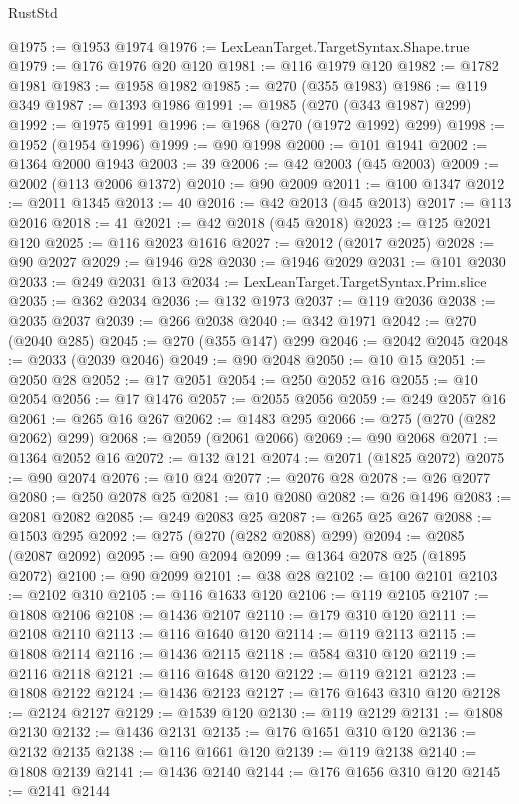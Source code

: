 \begin{lexlean}{RustStd}
\begin{coremodule}
@1975 := @1953 @1974
@1976 := LexLeanTarget.TargetSyntax.Shape.true
@1979 := @176 @1976 @20 @120
@1981 := @116 @1979 @120
@1982 := @1782 @1981
@1983 := @1958 @1982
@1985 := @270 (@355 @1983)
@1986 := @119 @349
@1987 := @1393 @1986
@1991 := @1985 (@270 (@343 @1987) @299)
@1992 := @1975 @1991
@1996 := @1968 (@270 (@1972 @1992) @299)
@1998 := @1952 (@1954 @1996)
@1999 := @90 @1998
@2000 := @101 @1941
@2002 := @1364 @2000 @1943
@2003 := 39
@2006 := @42 @2003 (@45 @2003)
@2009 := @2002 (@113 @2006 @1372)
@2010 := @90 @2009
@2011 := @100 @1347
@2012 := @2011 @1345
@2013 := 40
@2016 := @42 @2013 (@45 @2013)
@2017 := @113 @2016
@2018 := 41
@2021 := @42 @2018 (@45 @2018)
@2023 := @125 @2021 @120
@2025 := @116 @2023 @1616
@2027 := @2012 (@2017 @2025)
@2028 := @90 @2027
@2029 := @1946 @28
@2030 := @1946 @2029
@2031 := @101 @2030
@2033 := @249 @2031 @13
@2034 := LexLeanTarget.TargetSyntax.Prim.slice
@2035 := @362 @2034
@2036 := @132 @1973
@2037 := @119 @2036
@2038 := @2035 @2037
@2039 := @266 @2038
@2040 := @342 @1971
@2042 := @270 (@2040 @285)
@2045 := @270 (@355 @147) @299
@2046 := @2042 @2045
@2048 := @2033 (@2039 @2046)
@2049 := @90 @2048
@2050 := @10 @15
@2051 := @2050 @28
@2052 := @17 @2051
@2054 := @250 @2052 @16
@2055 := @10 @2054
@2056 := @17 @1476
@2057 := @2055 @2056
@2059 := @249 @2057 @16
@2061 := @265 @16 @267
@2062 := @1483 @295
@2066 := @275 (@270 (@282 @2062) @299)
@2068 := @2059 (@2061 @2066)
@2069 := @90 @2068
@2071 := @1364 @2052 @16
@2072 := @132 @121
@2074 := @2071 (@1825 @2072)
@2075 := @90 @2074
@2076 := @10 @24
@2077 := @2076 @28
@2078 := @26 @2077
@2080 := @250 @2078 @25
@2081 := @10 @2080
@2082 := @26 @1496
@2083 := @2081 @2082
@2085 := @249 @2083 @25
@2087 := @265 @25 @267
@2088 := @1503 @295
@2092 := @275 (@270 (@282 @2088) @299)
@2094 := @2085 (@2087 @2092)
@2095 := @90 @2094
@2099 := @1364 @2078 @25 (@1895 @2072)
@2100 := @90 @2099
@2101 := @38 @28
@2102 := @100 @2101
@2103 := @2102 @310
@2105 := @116 @1633 @120
@2106 := @119 @2105
@2107 := @1808 @2106
@2108 := @1436 @2107
@2110 := @179 @310 @120
@2111 := @2108 @2110
@2113 := @116 @1640 @120
@2114 := @119 @2113
@2115 := @1808 @2114
@2116 := @1436 @2115
@2118 := @584 @310 @120
@2119 := @2116 @2118
@2121 := @116 @1648 @120
@2122 := @119 @2121
@2123 := @1808 @2122
@2124 := @1436 @2123
@2127 := @176 @1643 @310 @120
@2128 := @2124 @2127
@2129 := @1539 @120
@2130 := @119 @2129
@2131 := @1808 @2130
@2132 := @1436 @2131
@2135 := @176 @1651 @310 @120
@2136 := @2132 @2135
@2138 := @116 @1661 @120
@2139 := @119 @2138
@2140 := @1808 @2139
@2141 := @1436 @2140
@2144 := @176 @1656 @310 @120
@2145 := @2141 @2144

\end{coremodule}
\end{lexlean}
